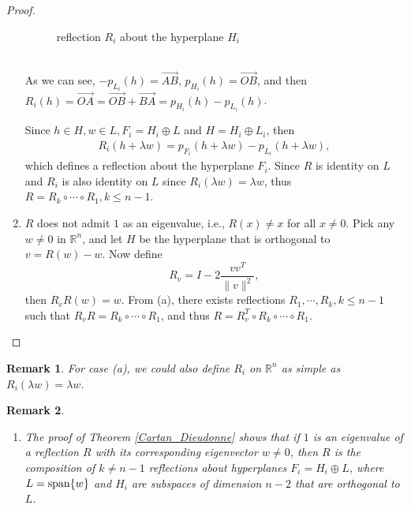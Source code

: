 \documentclass[11pt]{book}
\newtheorem{remark}{Remark}[chapter]
\theoremstyle{definition}
\numberwithin{equation}{chapter}
\begin{document}
\begin{subappendices}
\begin{proof}
\begin{enumerate}[label=(\alph*)]
    \begin{figure}[h]
        \centering
        \caption{reflection $R_i$ about the hyperplane $H_i$}
        \label{fig:plot_2}
    \end{figure}\\
    As we can see, $- p_{L_i}(h) = \overrightarrow{AB}$, $p_{H_i}(h) = \overrightarrow{OB}$, and then $R_i(h) = \overrightarrow{OA} = \overrightarrow{OB} + \overrightarrow{BA} = p_{H_i}(h) - p_{L_i}(h)$.
    
    Since $h \in H, w \in L, F_i = H_i \oplus L$ and $H = H_i \oplus L_i$, then
    \begin{align*}
        R_i(h + \lambda w) = p_{F_i}(h + \lambda w) - p_{L_i}(h + \lambda w), 
    \end{align*}
    which defines a reflection about the hyperplane $F_i$. Since $R$ is identity on $L$ and $R_i$ is also identity on $L$ since $R_i(\lambda w) = \lambda w$, thus $R = R_k \circ \cdots \circ R_1, k \leq n - 1$.
    
    \item $R$ does not admit $1$ as an eigenvalue, i.e., $R(x) \neq x$ for all $x \neq 0$. Pick any $w \neq 0$ in $\mathbb{R}^n$, and let $H$ be the hyperplane that is orthogonal to $v = R(w) - w$. Now define 
    $$R_v = I - 2 \frac{vv^T}{\|v\|^2},$$ 
    then $R_v R (w) = w$. From (a), there exists reflections $R_1, \cdots, R_k, k \leq n - 1$ such that $R_v R = R_k \circ \cdots \circ R_1$, and thus $R = R_v^T \circ R_k \circ \cdots \circ R_1$. 
\end{enumerate}
\end{proof}


\begin{remark}
For case (a), we could also define $R_i$ on $\mathbb{R}^n$ as simple as $R_i(\lambda w) = \lambda w$.
\end{remark}

\begin{remark}
~\begin{enumerate}[label=(\alph*)]
    \item The proof of Theorem \ref{Cartan_Dieudonne} shows that if $1$ is an eigenvalue of a reflection $R$ with its corresponding eigenvector $w \neq 0$, then $R$ is the composition of $k \neq n - 1$ reflections about hyperplanes $F_i = H_i \oplus L$, where $L = {\rm span}\{w\}$ and $H_i$ are subspaces of dimension $n - 2$ that are orthogonal to $L$. 
    

\end{enumerate}
\end{remark}
\end{subappendices}
\end{document}
